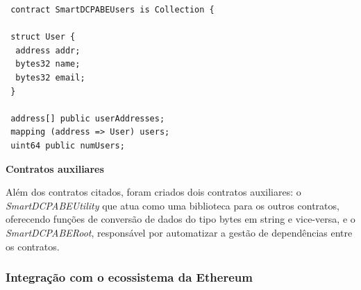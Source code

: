 \documentclass[a4paper,11pt]{article}
\begin{document}

\begin{lstlisting}
 contract SmartDCPABEUsers is Collection {

 struct User {
  address addr;
  bytes32 name;
  bytes32 email;
 }

 address[] public userAddresses;
 mapping (address => User) users;
 uint64 public numUsers;
\end{lstlisting}



\textbf{Contratos auxiliares}
\label{sec:sub:ImplementacaoSmartContracts:ContratosAuxiliares}

Além dos contratos citados, foram criados dois contratos auxiliares: o \emph{SmartDCPABEUtility} que atua como uma biblioteca para os outros contratos, oferecendo funções de conversão de dados do tipo bytes em string e vice-versa, e o \emph{SmartDCPABERoot}, responsável por automatizar a gestão de dependências entre os contratos. %


\subsubsection{Integração com o ecossistema da Ethereum}


\end{document}
